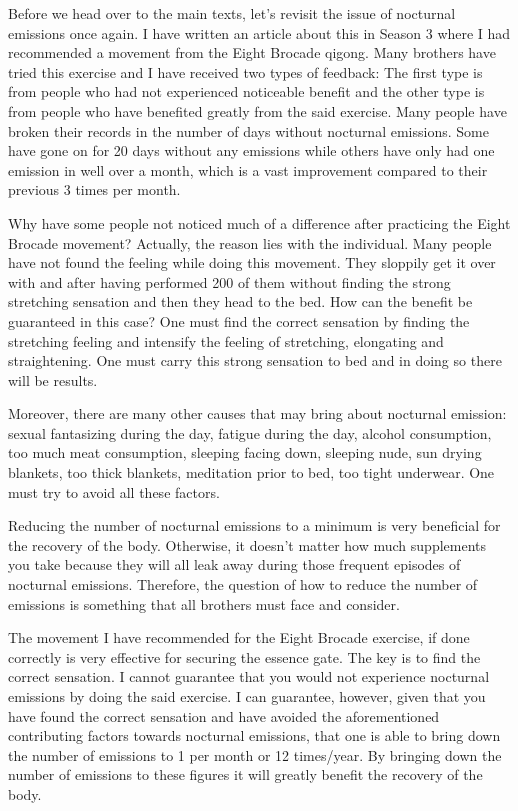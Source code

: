 \documentclass[
]{book}
\begin{document}
Before we head over to the main texts, let's revisit the issue of nocturnal emissions once again. I have written an article about this in Season 3 where I had recommended a movement from the Eight Brocade qigong. Many brothers have tried this exercise and I have received two types of feedback: The first type is from people who had not experienced noticeable benefit and the other type is from people who have benefited greatly from the said exercise. Many people have broken their records in the number of days without nocturnal emissions. Some have gone on for 20 days without any emissions while others have only had one emission in well over a month, which is a vast improvement compared to their previous 3 times per month.

Why have some people not noticed much of a difference after practicing the Eight Brocade movement? Actually, the reason lies with the individual. Many people have not found the feeling while doing this movement. They sloppily get it over with and after having performed 200 of them without finding the strong stretching sensation and then they head to the bed. How can the benefit be guaranteed in this case? One must find the correct sensation by finding the stretching feeling and intensify the feeling of stretching, elongating and straightening. One must carry this strong sensation to bed and in doing so there will be results.

Moreover, there are many other causes that may bring about nocturnal emission: sexual fantasizing during the day, fatigue during the day, alcohol consumption, too much meat consumption, sleeping facing down, sleeping nude, sun drying blankets, too thick blankets, meditation prior to bed, too tight underwear. One must try to avoid all these factors.

Reducing the number of nocturnal emissions to a minimum is very beneficial for the recovery of the body. Otherwise, it doesn't matter how much supplements you take because they will all leak away during those frequent episodes of nocturnal emissions. Therefore, the question of how to reduce the number of emissions is something that all brothers must face and consider.

The movement I have recommended for the Eight Brocade exercise, if done correctly is very effective for securing the essence gate. The key is to find the correct sensation. I cannot guarantee that you would not experience nocturnal emissions by doing the said exercise. I can guarantee, however, given that you have found the correct sensation and have avoided the aforementioned contributing factors towards nocturnal emissions, that one is able to bring down the number of emissions to 1 per month or 12 times/year. By bringing down the number of emissions to these figures it will greatly benefit the recovery of the body.
\end{document}
